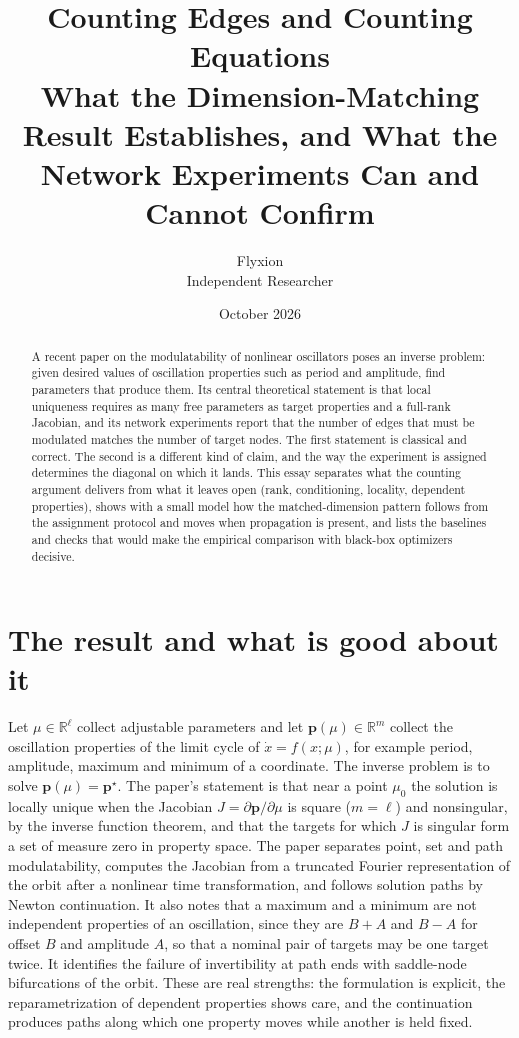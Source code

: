 \documentclass[11pt]{article}
\title{Counting Edges and Counting Equations\\[4pt]\large What the Dimension-Matching Result Establishes, and What the Network Experiments Can and Cannot Confirm}
\author{Flyxion\\Independent Researcher}
\date{October 2026}
\newcommand{\R}{\mathbb{R}}
\begin{document}
\maketitle
\begin{abstract}
A recent paper on the modulatability of nonlinear oscillators poses an inverse problem: given desired values of oscillation properties such as period and amplitude, find parameters that produce them. Its central theoretical statement is that local uniqueness requires as many free parameters as target properties and a full-rank Jacobian, and its network experiments report that the number of edges that must be modulated matches the number of target nodes. The first statement is classical and correct. The second is a different kind of claim, and the way the experiment is assigned determines the diagonal on which it lands. This essay separates what the counting argument delivers from what it leaves open (rank, conditioning, locality, dependent properties), shows with a small model how the matched-dimension pattern follows from the assignment protocol and moves when propagation is present, and lists the baselines and checks that would make the empirical comparison with black-box optimizers decisive.
\end{abstract}

\section{The result and what is good about it}

Let $\mu\in\R^{\ell}$ collect adjustable parameters and let $\mathbf p(\mu)\in\R^{m}$ collect the oscillation properties of the limit cycle of $\dot x=f(x;\mu)$, for example period, amplitude, maximum and minimum of a coordinate. The inverse problem is to solve $\mathbf p(\mu)=\mathbf p^{\star}$. The paper's statement is that near a point $\mu_0$ the solution is locally unique when the Jacobian $J=\partial\mathbf p/\partial\mu$ is square ($m=\ell$) and nonsingular, by the inverse function theorem, and that the targets for which $J$ is singular form a set of measure zero in property space. The paper separates point, set and path modulatability, computes the Jacobian from a truncated Fourier representation of the orbit after a nonlinear time transformation, and follows solution paths by Newton continuation. It also notes that a maximum and a minimum are not independent properties of an oscillation, since they are $B+A$ and $B-A$ for offset $B$ and amplitude $A$, so that a nominal pair of targets may be one target twice. It identifies the failure of invertibility at path ends with saddle-node bifurcations of the orbit. These are real strengths: the formulation is explicit, the reparametrization of dependent properties shows care, and the continuation produces paths along which one property moves while another is held fixed.
\end{document}
